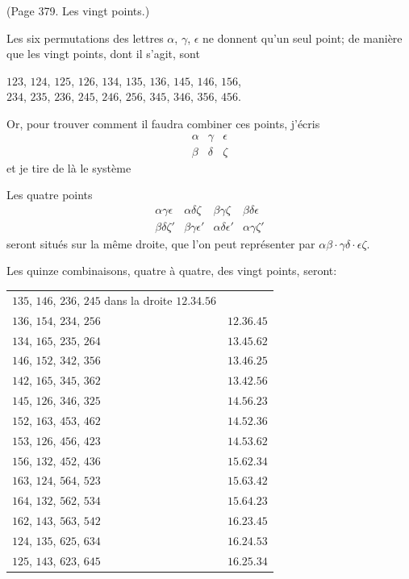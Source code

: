 \documentclass[11pt,a4paper]{book}
\begin{document}
(Page 379. Les vingt points.)

Les six permutations des lettres $\alpha$, $\gamma$, $\epsilon$ ne donnent qu'un seul point;
de mani\`{e}re que les vingt points, dont il s'agit, sont
\begin{center}
$123$, $124$, $125$, $126$, $134$, $135$, $136$, $145$, $146$, $156$, \\
$234$, $235$, $236$, $245$, $246$, $256$, $345$, $346$, $356$, $456$.
\end{center}

Or, pour trouver comment il faudra combiner ces points, j'\'{e}cris
\[
\begin{array}{ccc}
\alpha & \gamma & \epsilon \\
\beta & \delta & \zeta
\end{array}
\]
et je tire de l\`{a} le syst\`{e}me

Les quatre points
\[
\begin{array}{cccc}
\alpha\gamma\epsilon & \alpha\delta\zeta & \beta\gamma\zeta & \beta\delta\epsilon \\
\beta\delta\zeta' & \beta\gamma\epsilon' & \alpha\delta\epsilon' & \alpha\gamma\zeta'
\end{array}
\]
seront situ\'{e}s sur la m\^{e}me droite, que l'on peut repr\'{e}senter par
$\alpha\beta \cdot \gamma\delta \cdot \epsilon\zeta$.

Les quinze combinaisons, quatre \`{a} quatre, des vingt points, seront:
\begin{center}
\begin{tabular}{ll}
$135$, $146$, $236$, $245$ dans la droite $12.34.56$ \\
$136$, $154$, $234$, $256$ & $12.36.45$ \\
$134$, $165$, $235$, $264$ & $13.45.62$ \\
$146$, $152$, $342$, $356$ & $13.46.25$ \\
$142$, $165$, $345$, $362$ & $13.42.56$ \\
$145$, $126$, $346$, $325$ & $14.56.23$ \\
$152$, $163$, $453$, $462$ & $14.52.36$ \\
$153$, $126$, $456$, $423$ & $14.53.62$ \\
$156$, $132$, $452$, $436$ & $15.62.34$ \\
$163$, $124$, $564$, $523$ & $15.63.42$ \\
$164$, $132$, $562$, $534$ & $15.64.23$ \\
$162$, $143$, $563$, $542$ & $16.23.45$ \\
$124$, $135$, $625$, $634$ & $16.24.53$ \\
$125$, $143$, $623$, $645$ & $16.25.34$
\end{tabular}
\end{center}
\end{document}
